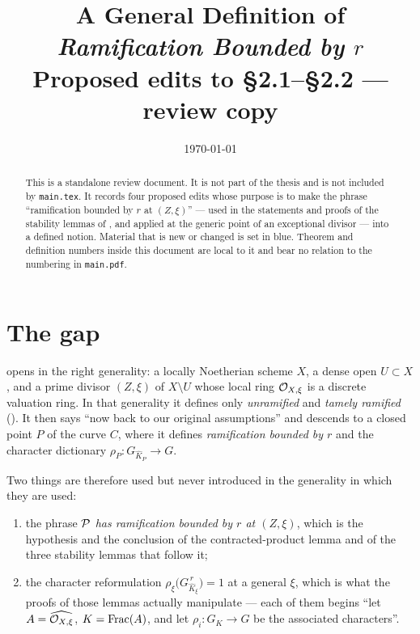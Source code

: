 \documentclass[11pt]{report}
\title{A General Definition of \emph{Ramification Bounded by $r$}\\[0.3em]
       {\large Proposed edits to \S2.1--\S2.2 --- review copy}}
\author{}
\date{\today}
\newcommand{\new}[1]{\textcolor{newmath}{#1}}
\begin{document}
\maketitle

\begin{abstract}
\noindent
This is a standalone review document. It is not part of the thesis and is not
included by \texttt{main.tex}. It records four proposed edits whose purpose is
to make the phrase ``ramification bounded by $r$ at $(Z,\xi)$'' --- used in the
statements and proofs of the stability lemmas of
, and applied at the generic point of an
exceptional divisor --- into a defined notion. Material that is
\new{new or changed} is set in blue. Theorem and definition numbers inside this
document are local to it and bear no relation to the numbering in
\texttt{main.pdf}.
\end{abstract}

\chapter*{The gap}

 opens in the right generality: a locally
Noetherian scheme $X$, a dense open $U\subset X$, and a prime divisor $(Z,\xi)$
of $X\setminus U$ whose local ring $\mathcal{O}_{X,\xi}$ is a discrete valuation ring.
In that generality it defines only \emph{unramified} and \emph{tamely ramified}
(). It then says ``now back to our
original assumptions'' and descends to a closed point $P$ of the curve $C$,
where it defines \emph{ramification bounded by $r$} and the character
dictionary $\rho_P:G_{\widehat K_P}\to G$.

Two things are therefore used but never introduced in the generality in which
they are used:

\begin{enumerate}
    \item the phrase \emph{$\mathcal{P}$ has ramification bounded by $r$ at $(Z,\xi)$},
    which is the hypothesis and the conclusion of the contracted-product
    lemma and of the three stability lemmas that follow it;
    \item the character reformulation
    $\rho_\xi\bigl(G^{\,r}_{\widehat K_\xi}\bigr)=1$ at a general $\xi$, which
    is what the proofs of those lemmas actually manipulate --- each of them
    begins ``let $A=\widehat{\mathcal{O}_{X,\xi}}$, $K=\operatorname{Frac}(A)$, and let
    $\rho_i:G_K\to G$ be the associated characters''.
\end{enumerate}
\end{document}
